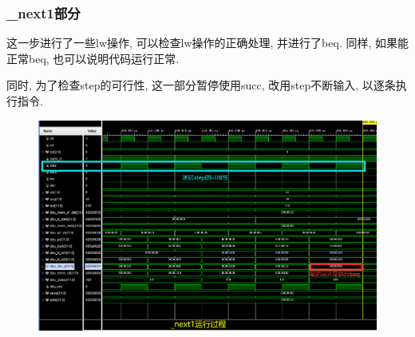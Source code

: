\documentclass[UTF8]{article}
\begin{document}
\subsubsection{\_next1部分}
这一步进行了一些lw操作, 可以检查lw操作的正确处理, 并进行了beq. 同样, 如果能正常beq, 也可以说明代码运行正常.\par
同时, 为了检查step的可行性, 这一部分暂停使用succ, 改用step不断输入, 以逐条执行指令.
\begin{figure}[H]
	\centering
	\includegraphics[width=\linewidth]{_next1.png}
\end{figure}
\end{document}
